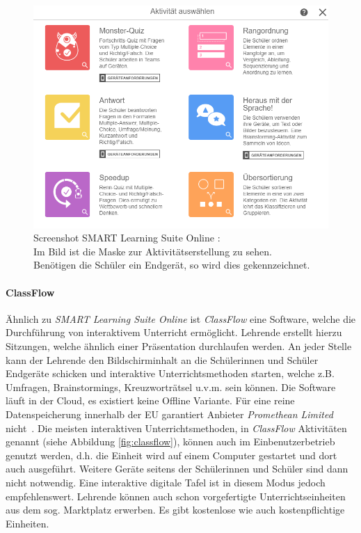 \begin{figure}[H]
	\centering
	\includegraphics[width=0.9\linewidth]{bilder/screenshot_slo}
	\caption[Screenshot SMART Learning Suite Online]{Screenshot SMART Learning Suite Online \cite{slso}:\\ Im Bild ist die Maske zur Aktivitätserstellung zu sehen. \\ Benötigen die Schüler ein Endgerät, so wird dies gekennzeichnet.}
	\label{fig:slso}
\end{figure}

\paragraph{ClassFlow}
Ähnlich zu \emph{SMART Learning Suite Online} ist \emph{ClassFlow} eine Software, welche die
Durchführung von interaktivem Unterricht ermöglicht. Lehrende erstellt hierzu Sitzungen, welche ähnlich einer Präsentation durchlaufen werden. An jeder Stelle kann der Lehrende den Bildschirminhalt an die Schülerinnen und Schüler Endgeräte schicken und interaktive Unterrichtsmethoden starten, welche z.B. Umfragen, Brainstormings, Kreuzworträtsel u.v.m. sein können. Die Software läuft in der Cloud, es existiert keine Offline Variante. Für eine reine Datenspeicherung innerhalb der EU garantiert Anbieter \emph{Promethean Limited} nicht~\cite{Limited2017}. Die meisten interaktiven Unterrichtsmethoden, in \emph{ClassFlow} Aktivitäten genannt (siehe Abbildung \ref{fig:classflow}), können auch im Einbenutzerbetrieb genutzt werden, d.h. die Einheit wird auf einem Computer gestartet und dort auch ausgeführt. Weitere Geräte seitens der Schülerinnen und Schüler sind dann nicht notwendig. Eine interaktive digitale Tafel ist in diesem Modus jedoch empfehlenswert. Lehrende können auch schon vorgefertigte Unterrichtseinheiten aus dem sog. Marktplatz erwerben. Es gibt kostenlose wie auch kostenpflichtige Einheiten.  

